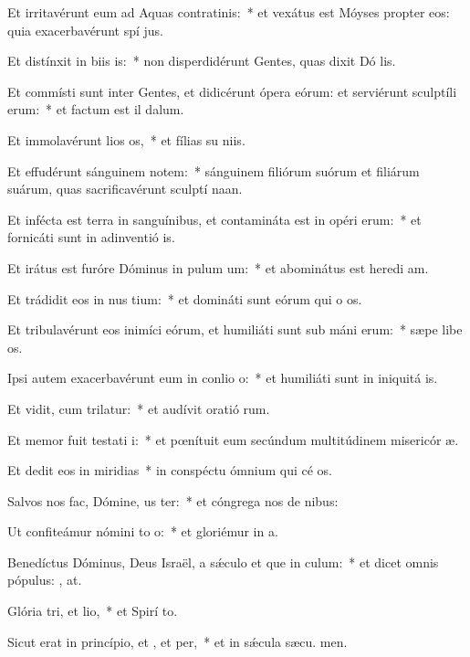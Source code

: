 \item Et irritavérunt eum ad Aquas contratinis:~* et vexátus est Móyses propter eos: quia exacerbavérunt spí jus.
\item Et distínxit in biis is:~* non disperdidérunt Gentes, quas dixit Dó lis.
\item Et commísti sunt inter Gentes, et didicérunt ópera eórum: et serviérunt sculptíli erum:~* et factum est il  dalum.
\item Et immolavérunt lios os,~* et fílias su niis.
\item Et effudérunt sánguinem notem:~* sánguinem filiórum suórum et filiárum suárum, quas sacrificavérunt sculptí naan.
\item Et infécta est terra in sanguínibus, et contamináta est in opéri erum:~* et fornicáti sunt in adinventió is.
\item Et irátus est furóre Dóminus in pulum um:~* et abominátus est heredi am.
\item Et trádidit eos in nus tium:~* et domináti sunt eórum qui o os.
\item Et tribulavérunt eos inimíci eórum, et humiliáti sunt sub máni erum:~* sæpe libe os.
\item Ipsi autem exacerbavérunt eum in conlio o:~* et humiliáti sunt in iniquitá is.
\item Et vidit, cum trilatur:~* et audívit oratió rum.
\item Et memor fuit testati i:~* et pœnítuit eum secúndum multitúdinem misericór æ.
\item Et dedit eos in miridias~* in conspéctu ómnium qui cé os.
\item Salvos nos fac, Dómine, us ter:~* et cóngrega nos de nibus:
\item Ut confiteámur nómini to o:~* et gloriémur in  a.
\item Benedíctus Dóminus, Deus Israël, a sǽculo et que in culum:~* et dicet omnis pópulus: , at.
\item Glória tri, et lio,~* et Spirí to.
\item Sicut erat in princípio, et , et per,~* et in sǽcula sæcu. men.
